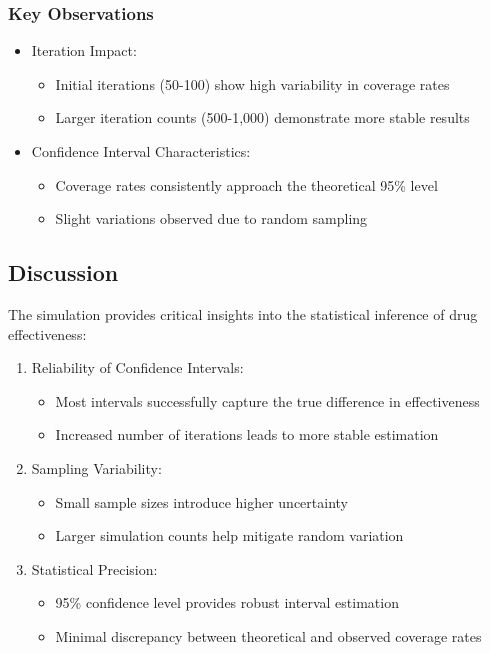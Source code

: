 \documentclass[12pt]{article}
\begin{document}
\subsubsection{Key Observations}
\begin{itemize}
    \item Iteration Impact:
    \begin{itemize}
        \item Initial iterations (50-100) show high variability in coverage rates
        \item Larger iteration counts (500-1,000) demonstrate more stable results
    \end{itemize}
    
    \item Confidence Interval Characteristics:
    \begin{itemize}
        \item Coverage rates consistently approach the theoretical 95\% level
        \item Slight variations observed due to random sampling
    \end{itemize}
\end{itemize}

\subsection{Discussion}
The simulation provides critical insights into the statistical inference of drug effectiveness:

\begin{enumerate}
    \item Reliability of Confidence Intervals:
    \begin{itemize}
        \item Most intervals successfully capture the true difference in effectiveness
        \item Increased number of iterations leads to more stable estimation
    \end{itemize}
    
    \item Sampling Variability:
    \begin{itemize}
        \item Small sample sizes introduce higher uncertainty
        \item Larger simulation counts help mitigate random variation
    \end{itemize}
    
    \item Statistical Precision:
    \begin{itemize}
        \item 95\% confidence level provides robust interval estimation
        \item Minimal discrepancy between theoretical and observed coverage rates
    \end{itemize}
\end{enumerate}
\end{document}
